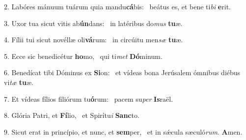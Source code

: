 2. Labóres mánuum tuárum quia mandu\textbf{cá}bis: \ast\  beátus es, et bene ti\textit{bi} \textbf{e}rit.\

3. Uxor tua sicut vitis ab\textbf{ún}dans: \ast\  in latéribus do\textit{mus} \textbf{tu}æ.\

4. Fílii tui sicut novéllæ oli\textbf{vá}rum: \ast\  in circúitu men\textit{sæ} \textbf{tu}æ.\

5. Ecce sic benedicétur \textbf{ho}mo, \ast\  qui ti\textit{met} \textbf{Dó}minum.\

6. Benedícat tibi Dóminus ex \textbf{Si}on: \ast\  et vídeas bona Jerúsalem ómnibus diébus vi\textit{tæ} \textbf{tu}æ.\

7. Et vídeas fílios filiórum tu\textbf{ó}rum: \ast\  pacem su\textit{per} \textbf{Is}raël.\

8. Glória Patri, et \textbf{Fí}lio, \ast\  et Spirítu\textit{i} \textbf{Sanc}to.\

9. Sicut erat in princípio, et nunc, et \textbf{sem}per, \ast\  et in sǽcula sæculó\textit{rum}. \textbf{A}men.\

